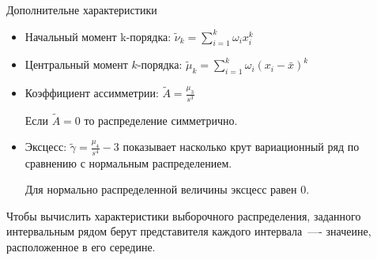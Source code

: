 \documentclass[unicode,11pt,notheorems,xcolor=table]{beamer}
\begin{document}
\begin{frame}{Дополнительне характеристики}{}
    \begin{itemize}
       \item Начальный момент k-порядка:
       $
       \displaystyle \tilde{\nu}_k= \sum_{i=1}^k \omega_i x^k_i
       $
       
       \vfill
       \item Центральный момент $k$-порядка:
       $
       \displaystyle    \tilde{\mu}_k= \sum_{i=1}^k \omega_i (x_i-\bar{x})^k
       $
       
       \vfill\item Коэффициент ассимметрии: 
       $
       \displaystyle   \tilde{A} = \frac{\mu_3}{s^3}
       $

       Если $\tilde{A} = 0$ то распределение симметрично.
        
        \vfill
        \item Эксцесс:            
        $
        \displaystyle  \tilde{\gamma} = \frac{\mu_4}{s^4}-3
        $
        показывает насколько крут вариационный ряд по сравнению с нормальным распределением. 

        Для нормально распределенной величины эксцесс равен 0.
        
    \end{itemize}
\end{frame}

\begin{frame}{}{}
    Чтобы вычислить характеристики выборочного распределения, заданного интервальным рядом берут представителя каждого интервала~----  значеине, расположенное в его середине.
\end{frame}
\end{document}
